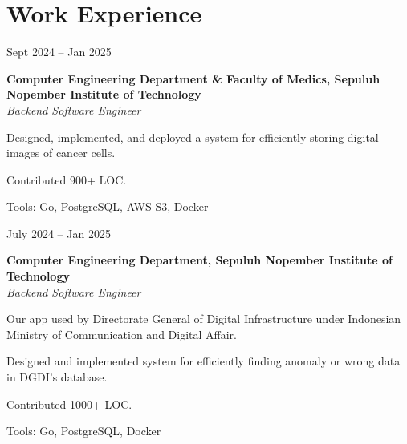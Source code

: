\section{Work Experience}

    \begin{twocolentry}{
        Sept 2024 – Jan 2025
    }

    \textbf{Computer Engineering Department \& Faculty of Medics, Sepuluh Nopember Institute of Technology}\\
    \textit{Backend Software Engineer}
    \end{twocolentry}

    \vspace{0.10 cm}
    \begin{onecolentry}
        \begin{highlights}
            \item Designed, implemented, and deployed a system for efficiently storing digital images of cancer cells.
            \item Contributed 900+ LOC.
            \item Tools: Go, PostgreSQL, AWS S3, Docker
        \end{highlights}
    \end{onecolentry}

    \vspace{0.2 cm}

    \begin{twocolentry}{
        July 2024 – Jan 2025
    }

    \textbf{Computer Engineering Department, Sepuluh Nopember Institute of Technology }\\
    \textit{Backend Software Engineer}
    \end{twocolentry}

    \vspace{0.10 cm}
    \begin{onecolentry}
        \begin{highlights}
            \item Our app used by Directorate General of Digital Infrastructure under Indonesian Ministry of Communication and Digital Affair.
            \item Designed and implemented system for efficiently finding anomaly or wrong data in DGDI's database.
            \item Contributed 1000+ LOC.
            \item Tools: Go, PostgreSQL, Docker
        \end{highlights}
    \end{onecolentry}

